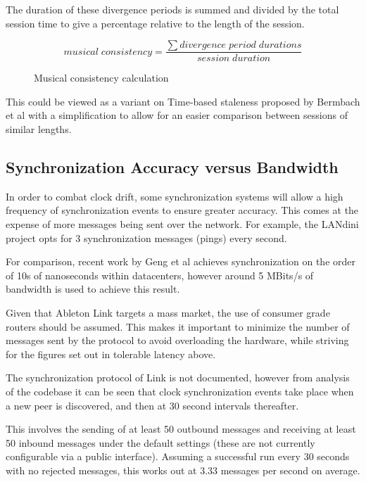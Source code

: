 \documentclass[11pt]{article} %
\theoremstyle{plain}
\theoremstyle{definition}
\begin{document}
The duration of these divergence periods is summed and divided by the total
session time to give a percentage relative to the length of the session.

\begin{figure}
  \caption{Musical consistency calculation}
  \centering
  \begin{equation}\label{eqn:musical-consistency}
    musical\;consistency=\frac{\sum divergence\;period\;durations}{session\;duration}
  \end{equation}
\end{figure}

This could be viewed as a variant on Time-based staleness proposed by Bermbach
et al \cite{bermbach2013towards} with a simplification to allow for an easier
comparison between sessions of similar lengths.

\subsection{Synchronization Accuracy versus Bandwidth}

In order to combat clock drift, some synchronization systems will allow a high
frequency of synchronization events to ensure greater accuracy. This comes at
the expense of more messages being sent over the network. For example, the
LANdini project opts for 3 synchronization messages (pings) every second.

For comparison, recent work by Geng et al\cite{geng2018} achieves
synchronization on the order of 10s of nanoseconds within datacenters, however
around 5 MBits/s of bandwidth is used to achieve this result.

Given that Ableton Link targets a mass market, the use of consumer grade
routers should be assumed. This makes it important to minimize the number of
messages sent by the protocol to avoid overloading the hardware, while striving
for the figures set out in tolerable latency above.

The synchronization protocol of Link is not documented, however from analysis
of the codebase it can be seen that clock synchronization events take place
when a new peer is discovered, and then at 30 second intervals thereafter.

This involves the sending of at least 50 outbound messages and receiving at
least 50 inbound messages under the default settings (these are not
currently configurable via a public interface). Assuming a successful run every
30 seconds with no rejected messages, this works out at 3.33 messages per
second on average.
\end{document}
